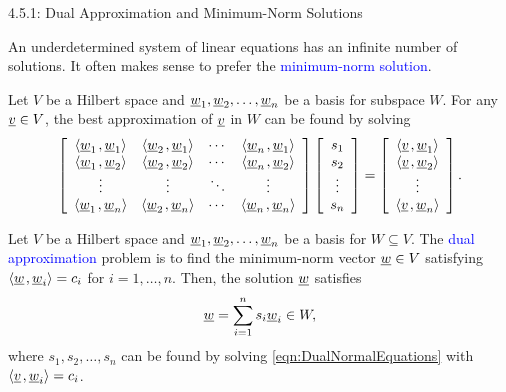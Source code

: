 \documentclass[10pt,english,aspectratio=169]{beamer}
\begin{document}
\begin{frame}{4.5.1: Dual Approximation and Minimum-Norm Solutions}

An underdetermined system of linear equations has an infinite number of solutions.
It often makes sense to prefer the \textcolor{blue}{minimum-norm solution}.

\vspace{1.5mm}

Let $V$ be a Hilbert space and $\underline{w}_1 ,\underline{w}_2 , \ldots, \underline{w}_n$ be a basis for subspace $W$.
For any $\underline{v} \in V$, the best approximation of $\underline{v}$ in $W$ can be found by solving
\begin{equation} \label{eqn:DualNormalEquations}
\left[ \begin{array}{cccc}
{\left\langle  \underline{w}_1  \mskip2mu ,  \underline{w}_1  \right\rangle}
& {\left\langle  \underline{w}_2  \mskip2mu ,  \underline{w}_1  \right\rangle} & \cdots
& {\left\langle  \underline{w}_n  \mskip2mu ,  \underline{w}_1  \right\rangle} \\
{\left\langle  \underline{w}_1  \mskip2mu ,  \underline{w}_2  \right\rangle}
& {\left\langle  \underline{w}_2  \mskip2mu ,  \underline{w}_2  \right\rangle} & \cdots
& {\left\langle  \underline{w}_n  \mskip2mu ,  \underline{w}_2  \right\rangle} \\
\vdots & \vdots & \ddots & \vdots \\
{\left\langle  \underline{w}_1  \mskip2mu ,  \underline{w}_n  \right\rangle}
& {\left\langle  \underline{w}_2  \mskip2mu ,  \underline{w}_n  \right\rangle} & \cdots
& {\left\langle  \underline{w}_n  \mskip2mu ,  \underline{w}_n  \right\rangle}
\end{array} \right]
\left[ \begin{array}{c}
s_1 \\ s_2 \\ \vdots \\ s_n \end{array} \right]
= \left[ \begin{array}{c}
{\left\langle  \underline{v}  \mskip2mu ,  \underline{w}_1  \right\rangle} \\
{\left\langle  \underline{v}  \mskip2mu ,  \underline{w}_2  \right\rangle} \\ \vdots \\
{\left\langle  \underline{v}  \mskip2mu ,  \underline{w}_n  \right\rangle} \end{array} \right] .
\end{equation}

\vspace{-1mm}

\begin{theorem}
Let $V$ be a Hilbert space and $\underline{w}_1 ,\underline{w}_2 , \ldots, \underline{w}_n$ be a basis for $W\subseteq V$.
The \textcolor{blue}{dual approximation} problem is to find the minimum-norm vector $\underline{w}\in V$ satisfying ${\left\langle  \underline{w}  \mskip2mu ,  \underline{w}_i  \right\rangle} = c_i$ for $i=1,\ldots,n$.
Then, the solution $\underline{w}$ satisfies \vspace{-3mm}
\[ \vecnot{w} = \sum_{i=1}^n s_i \vecnot{w}_i \in W, \vspace{-2.75mm} \]
where $s_1,s_2,\ldots,s_n$ can be found by solving \eqref{eqn:DualNormalEquations} with ${\left\langle  \underline{v}  \mskip2mu ,  \underline{w}_i  \right\rangle} = c_i$.
\end{theorem}

\end{frame}
\end{document}
